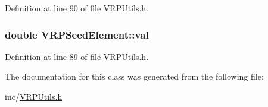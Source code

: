 Definition at line 90 of file VRPUtils.h.

\hypertarget{class_v_r_p_seed_element_a5afd4ea53120549e301ed93f7df7b859}{
\subsubsection[{val}]{\setlength{\rightskip}{0pt plus 5cm}double {\bf VRPSeedElement::val}}}
\label{class_v_r_p_seed_element_a5afd4ea53120549e301ed93f7df7b859}


Definition at line 89 of file VRPUtils.h.



The documentation for this class was generated from the following file:\begin{DoxyCompactItemize}
\item 
inc/\hyperlink{_v_r_p_utils_8h}{VRPUtils.h}\end{DoxyCompactItemize}

